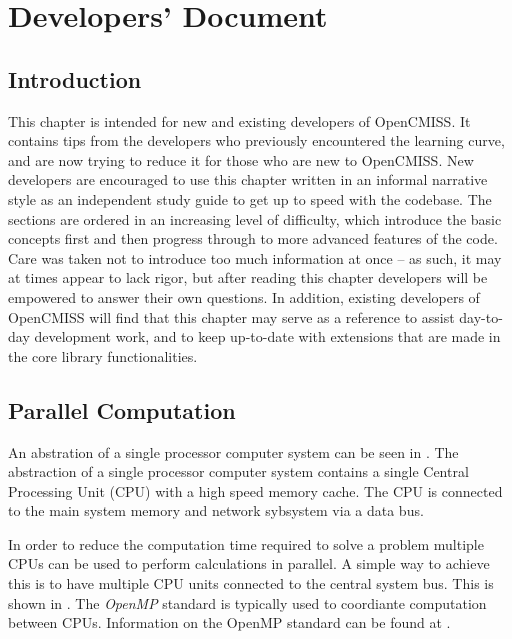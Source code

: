 \clearemptydoublepage
\chapter{Developers' Document}
\label{cha:DevelopersDocumentation}

\section{Introduction}
\label{sec:DevelopersIntroduction}

This chapter is intended for new and existing developers of OpenCMISS. It contains tips
from the developers who previously encountered the learning curve, and are now trying to 
reduce it for those who are new to OpenCMISS. New developers are encouraged to use this
chapter written in an informal narrative style as an independent study guide to get up to 
speed with the codebase. The sections are ordered in an increasing level of difficulty,
which introduce the basic concepts first and then progress through to more advanced features 
of the code. Care was taken not to introduce too much information at once -- as such, it
may at times appear to lack rigor, but after reading this chapter developers will be 
empowered to answer their own questions. In addition, existing developers of OpenCMISS 
will find that this chapter may serve as a reference to assist day-to-day development work, 
and to keep up-to-date with extensions that are made in the core library functionalities.

\section{Parallel Computation}
\label{sec:ParallelComputation}

An abstration of a single processor computer system can be seen
in . The abstraction of a single
processor computer system contains a single Central Processing Unit
(CPU) with a high speed memory cache. The CPU is connected to the main
system memory and network sybsystem via a data bus.


In order to reduce the computation time required to solve a problem
multiple CPUs can be used to perform calculations in parallel. A
simple way to achieve this is to have multiple CPU units connected to
the central system bus. This is shown
in . The \emph{OpenMP} standard is
typically used to coordiante computation between CPUs. Information on
the OpenMP standard can be found at .

